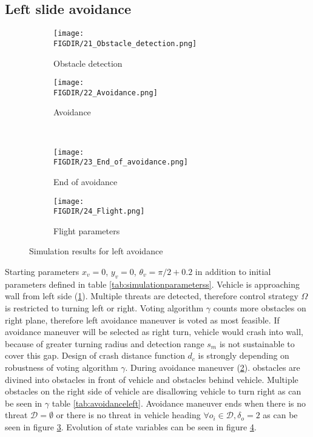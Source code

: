     
\subsection{Left slide avoidance}
\begin{figure}[H]
    \begin{subfigure}{0.5\textwidth}
    \texttt{[image: \\FIGDIR/21\_Obstacle\_detection.png]} 
    \caption{Obstacle detection}
    \label{fig:21Obstacledetection}
    \end{subfigure}
    \begin{subfigure}{0.5\textwidth}
    \texttt{[image: \\FIGDIR/22\_Avoidance.png]}
    \caption{Avoidance}
    \label{fig:22Avoidance}
    \end{subfigure}
    \\
    \begin{subfigure}{0.5\textwidth}
    \texttt{[image: \\FIGDIR/23\_End\_of\_avoidance.png]} 
    \caption{End of avoidance}
    \label{fig:23Endofavoidance}
    \end{subfigure}
    \begin{subfigure}{0.5\textwidth}
    \texttt{[image: \\FIGDIR/24\_Flight.png]}
    \caption{Flight parameters}
    \label{fig:24Flightparameters}
    \end{subfigure}
\caption{Simulation results for left avoidance}
\label{fig:SimulationLeft}
\end{figure}

Starting parameters $x_v = 0$, $y_v = 0$, $\theta_v = \pi/2 + 0.2 $ in addition to initial parameters defined in table \ref{tab:simulationparameterss}. Vehicle is approaching wall from left side (\ref{fig:21Obstacledetection}). Multiple threats are detected, therefore control strategy $\Omega$ is restricted to turning left or right. Voting algorithm $\gamma$ counts more obstacles on right plane, therefore left avoidance maneuver is voted as most feasible. If avoidance maneuver will be selected as right turn, vehicle would crash into wall, because of greater turning radius and detection range $s_m$ is not sustainable to cover this gap. Design of crash distance function $d_c$ is strongly depending on robustness of voting algorithm $\gamma$. During avoidance maneuver (\ref{fig:22Avoidance}). obstacles are divined into obstacles in front of vehicle and obstacles behind vehicle. Multiple obstacles on the right side of vehicle are disallowing vehicle to turn right as can be seen in $\gamma$ table \ref{tab:avoidanceleft}. Avoidance maneuver ends when there is no threat $\mathscr{D} = \emptyset$ or there is no threat in vehicle heading $\forall o_i\in\mathscr{D},\delta_o=2$ as can be seen in figure \ref{fig:23Endofavoidance}. Evolution of state variables can be seen in figure \ref{fig:24Flightparameters}.

